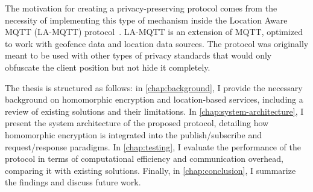 
The motivation for creating a privacy-preserving protocol comes from the necessity of implementing this type of mechanism inside the Location Aware MQTT (LA-MQTT) protocol~\cite{montori2022lamqtt}. LA-MQTT is an extension of MQTT, optimized to work with geofence data and location data sources. The protocol was originally meant to be used with other types of privacy standards that would only obfuscate the client position but not hide it completely.

The thesis is structured as follows: in \cref{chap:background}, I provide the necessary background on homomorphic encryption and location-based services, including a review of existing solutions and their limitations. In \cref{chap:system-architecture}, I present the system architecture of the proposed protocol, detailing how homomorphic encryption is integrated into the publish/subscribe and request/response paradigms. In \cref{chap:testing}, I evaluate the performance of the protocol in terms of computational efficiency and communication overhead, comparing it with existing solutions. Finally, in \cref{chap:conclusion}, I summarize the findings and discuss future work.
